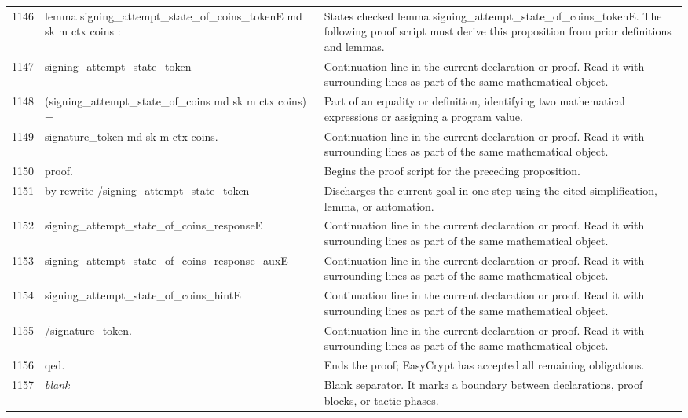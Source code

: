 \documentclass[10pt]{article}
\begin{document}
\begin{longtable}{r L{0.53\textwidth} L{0.37\textwidth}}
1146 & {\ttfamily\scriptsize lemma signing\_attempt\_state\_of\_coins\_tokenE md sk m ctx coins :} & States checked lemma signing\_attempt\_state\_of\_coins\_tokenE.  The following proof script must derive this proposition from prior definitions and lemmas. \\
1147 & {\ttfamily\scriptsize   signing\_attempt\_state\_token} & Continuation line in the current declaration or proof.  Read it with surrounding lines as part of the same mathematical object. \\
1148 & {\ttfamily\scriptsize     (signing\_attempt\_state\_of\_coins md sk m ctx coins) =} & Part of an equality or definition, identifying two mathematical expressions or assigning a program value. \\
1149 & {\ttfamily\scriptsize   signature\_token md sk m ctx coins.} & Continuation line in the current declaration or proof.  Read it with surrounding lines as part of the same mathematical object. \\
1150 & {\ttfamily\scriptsize proof.} & Begins the proof script for the preceding proposition. \\
1151 & {\ttfamily\scriptsize by rewrite /signing\_attempt\_state\_token} & Discharges the current goal in one step using the cited simplification, lemma, or automation. \\
1152 & {\ttfamily\scriptsize            signing\_attempt\_state\_of\_coins\_responseE} & Continuation line in the current declaration or proof.  Read it with surrounding lines as part of the same mathematical object. \\
1153 & {\ttfamily\scriptsize            signing\_attempt\_state\_of\_coins\_response\_auxE} & Continuation line in the current declaration or proof.  Read it with surrounding lines as part of the same mathematical object. \\
1154 & {\ttfamily\scriptsize            signing\_attempt\_state\_of\_coins\_hintE} & Continuation line in the current declaration or proof.  Read it with surrounding lines as part of the same mathematical object. \\
1155 & {\ttfamily\scriptsize            /signature\_token.} & Continuation line in the current declaration or proof.  Read it with surrounding lines as part of the same mathematical object. \\
1156 & {\ttfamily\scriptsize qed.} & Ends the proof; EasyCrypt has accepted all remaining obligations. \\
1157 & {\ttfamily\scriptsize \emph{blank}} & Blank separator.  It marks a boundary between declarations, proof blocks, or tactic phases. \\

\end{longtable}
\end{document}
